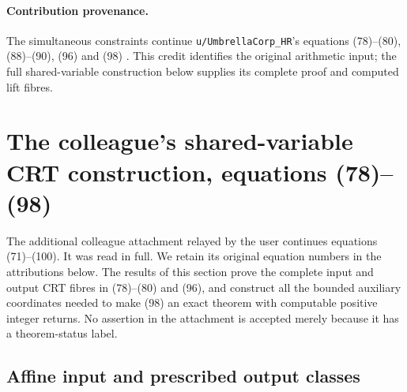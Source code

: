 \paragraph{Contribution provenance.} The simultaneous constraints continue \texttt{u/UmbrellaCorp\_HR}'s equations (78)--(80), (88)--(90), (96) and (98) \cite{UmbrellaContribution}. This credit identifies the original arithmetic input; the full shared-variable construction below supplies its complete proof and computed lift fibres.

\section{The colleague's shared-variable CRT construction, equations (78)--(98)}
\label{sec:shared-variable-crt}

The additional colleague attachment relayed by the user continues
equations (71)--(100).  It was read in full.  We retain its original
equation numbers in the attributions below.  The results of this
section prove the complete input and output CRT fibres in
(78)--(80) and (96), and construct all the bounded auxiliary
coordinates needed to make (98) an exact theorem with computable
positive integer returns.  No assertion in the attachment is
accepted merely because it has a theorem-status label.

\subsection{Affine input and prescribed output classes}

